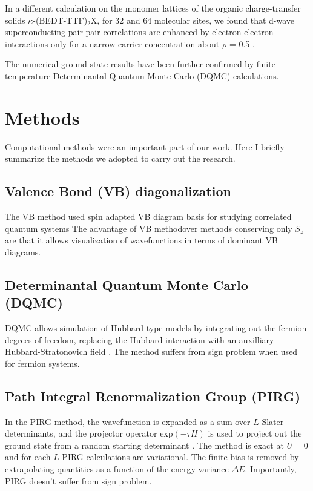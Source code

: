 \documentclass[a4paper,11pt]{article}
\begin{document}
In a different calculation  on the monomer lattices of the organic charge-transfer solids $\kappa$-(BEDT-TTF)$_{2}$X,  
for 32 and 64 molecular sites, we found that d-wave superconducting pair-pair correlations
are enhanced by electron-electron interactions only for a narrow carrier concentration about $\rho$ = 0.5 \cite{wpd2016}.


The numerical ground state results have been further confirmed by finite temperature Determinantal Quantum
Monte Carlo (DQMC) calculations. 


\section{Methods}
Computational methods were an important part of our work. Here I briefly summarize  the methods we adopted to carry out 
the research. 

\subsection{Valence Bond (VB) diagonalization}
The VB method used spin adapted VB diagram basis for studying correlated quantum systems \cite{ramashesha84b}%
The advantage of VB methodover methods conserving only $S_{z}$ are that it allows visualization of wavefunctions in terms of dominant VB diagrams. 

\subsection{Determinantal Quantum Monte Carlo (DQMC)}
DQMC allows simulation of Hubbard-type models by integrating out the fermion degrees of freedom, replacing the Hubbard interaction
with an auxilliary Hubbard-Stratonovich field \cite{blankenbecler81a}. The method suffers from sign problem when used for 
fermion systems. %

\subsection{Path Integral Renormalization Group (PIRG)}
In the PIRG method, the wavefunction is expanded as a sum over $L$ Slater determinants, and the projector operator exp$(-\tau H)$
is used to project out the ground state from a random starting determinant \cite{kashima01b}. The method is exact at $U=0$ and for each 
$L$ PIRG calculations are variational. The finite bias is removed by extrapolating quantities as a function of the energy variance $\Delta E$.
Importantly, PIRG doesn't suffer from sign problem.
\end{document}
